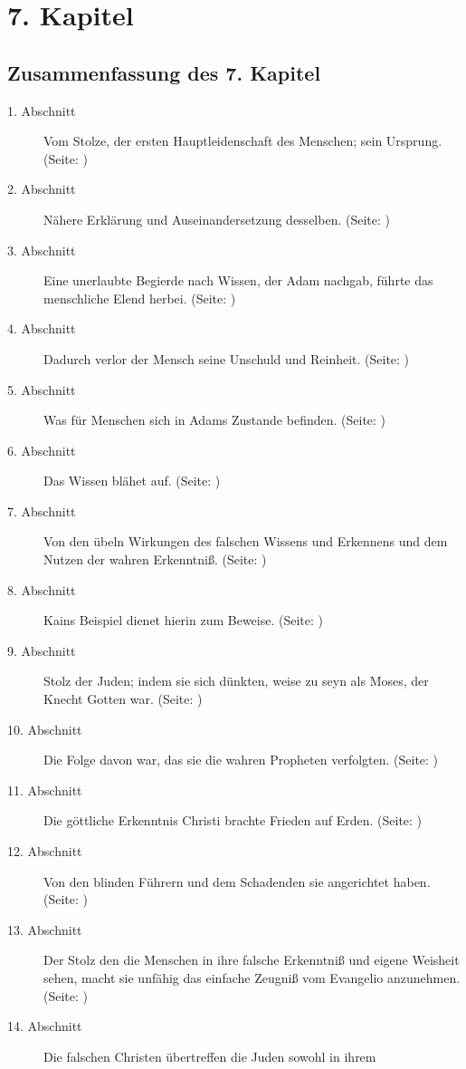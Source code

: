 
\chapter{7. Kapitel} \label{kap7}

\section{Zusammenfassung des 7. Kapitel}
\footnotesize
\begin{description}
\item[1. Abschnitt] Vom Stolze, der ersten Hauptleidenschaft des Menschen; sein
Ursprung. (Seite: \pageref{kap7_ab1})
\item[2. Abschnitt]  Nähere Erklärung und Auseinandersetzung desselben. (Seite: \pageref{kap7_ab2})
\item[3. Abschnitt] Eine unerlaubte Begierde nach Wissen, der Adam nachgab,
führte das menschliche Elend herbei. (Seite: \pageref{kap7_ab3})
\item[4. Abschnitt] Dadurch verlor der Mensch seine Unschuld und Reinheit. (Seite: \pageref{kap7_ab4})
\item[5. Abschnitt] Was für Menschen sich in Adams Zustande befinden. (Seite: \pageref{kap7_ab5})
\item[6. Abschnitt] Das Wissen blähet auf. (Seite: \pageref{kap7_ab6})
\item[7. Abschnitt] Von den übeln Wirkungen des falschen Wissens und Erkennens
und dem Nutzen der wahren Erkenntniß. (Seite: \pageref{kap7_ab7})
\item[8. Abschnitt] Kains Beispiel dienet hierin zum Beweise. (Seite: \pageref{kap7_ab8})
\item[9. Abschnitt] Stolz der Juden; indem sie sich dünkten, weise zu seyn als
Moses, der Knecht Gotten war. (Seite: \pageref{kap7_ab9})
\item[10. Abschnitt] Die Folge davon war, das sie die wahren Propheten
verfolgten. (Seite: \pageref{kap7_ab10})
\item[11. Abschnitt] Die göttliche Erkenntnis Christi brachte Frieden auf Erden. (Seite: \pageref{kap7_ab11})
\item[12. Abschnitt] Von den blinden Führern und dem Schadenden sie angerichtet
haben. (Seite: \pageref{kap7_ab12})
\item[13. Abschnitt] Der Stolz den die Menschen in ihre falsche Erkenntniß und
eigene Weisheit sehen, macht sie unfähig das einfache Zeugniß vom Evangelio
anzunehmen. (Seite: \pageref{kap7_ab13})
\item[14. Abschnitt] Die falschen Christen übertreffen die Juden sowohl in ihrem

\end{description}

